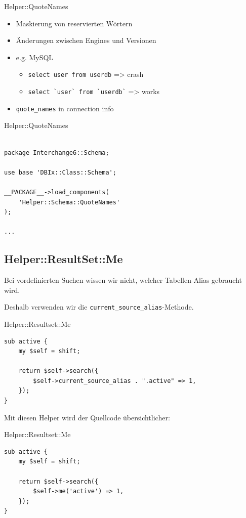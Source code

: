 \begin{frame}[fragile]{Helper::QuoteNames}
\begin{itemize}
\item Maskierung von reservierten Wörtern
\item Änderungen zwischen Engines und Versionen
\item e.g. MySQL
\begin{itemize}
\item \verb|select user from userdb| => crash
\item \verb|select `user` from `userdb`| => works
\end{itemize}
\item \verb|quote_names| in connection info
\end{itemize}
\end{frame}

\begin{frame}[fragile]{Helper::QuoteNames}
\begin{lstlisting}

package Interchange6::Schema;

use base 'DBIx::Class::Schema';

__PACKAGE__->load_components( 
    'Helper::Schema::QuoteNames' 
);

...

\end{lstlisting}
\end{frame}

\subsection{Helper::ResultSet::Me}

Bei vordefinierten Suchen wissen wir nicht, welcher Tabellen-Alias
gebraucht wird.

Deshalb verwenden wir die \verb|current_source_alias|-Methode.

\begin{frame}[fragile]{Helper::Resultset::Me}
\begin{lstlisting}
sub active {
    my $self = shift;

    return $self->search({ 
        $self->current_source_alias . ".active" => 1,
    });
}
\end{lstlisting}
\end{frame}

Mit diesen Helper wird der Quellcode übersichtlicher:

\begin{frame}[fragile]{Helper::Resultset::Me}
\begin{lstlisting}
sub active {
    my $self = shift;

    return $self->search({ 
        $self->me('active') => 1,
    });
}
\end{lstlisting}
\end{frame}

